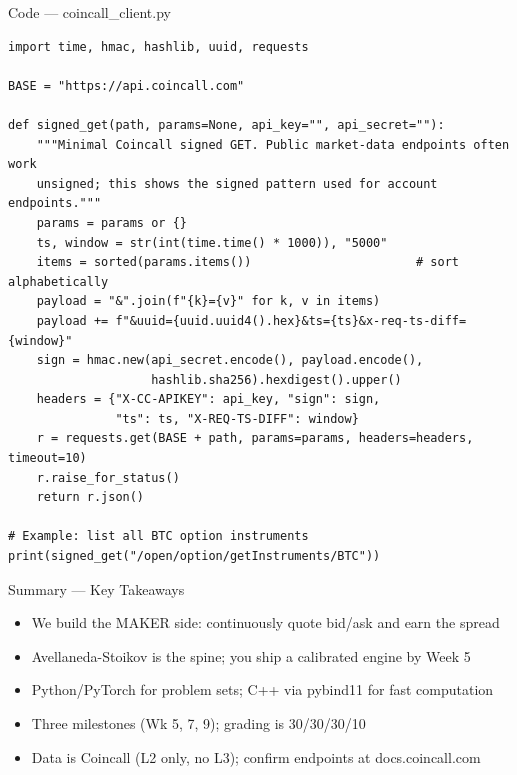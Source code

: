 \documentclass[aspectratio=169,10pt]{beamer}
\begin{document}
\begin{frame}[fragile]{Code --- coincall\_client.py}
\begin{lstlisting}
import time, hmac, hashlib, uuid, requests

BASE = "https://api.coincall.com"

def signed_get(path, params=None, api_key="", api_secret=""):
    """Minimal Coincall signed GET. Public market-data endpoints often work
    unsigned; this shows the signed pattern used for account endpoints."""
    params = params or {}
    ts, window = str(int(time.time() * 1000)), "5000"
    items = sorted(params.items())                       # sort alphabetically
    payload = "&".join(f"{k}={v}" for k, v in items)
    payload += f"&uuid={uuid.uuid4().hex}&ts={ts}&x-req-ts-diff={window}"
    sign = hmac.new(api_secret.encode(), payload.encode(),
                    hashlib.sha256).hexdigest().upper()
    headers = {"X-CC-APIKEY": api_key, "sign": sign,
               "ts": ts, "X-REQ-TS-DIFF": window}
    r = requests.get(BASE + path, params=params, headers=headers, timeout=10)
    r.raise_for_status()
    return r.json()

# Example: list all BTC option instruments
print(signed_get("/open/option/getInstruments/BTC"))
\end{lstlisting}
\end{frame}
\begin{frame}{Summary --- Key Takeaways}
\begin{itemize}
  \item We build the MAKER side: continuously quote bid/ask and earn the spread
  \item Avellaneda-Stoikov is the spine; you ship a calibrated engine by Week 5
  \item Python/PyTorch for problem sets; C++ via pybind11 for fast computation
  \item Three milestones (Wk 5, 7, 9); grading is 30/30/30/10
  \item Data is Coincall (L2 only, no L3); confirm endpoints at docs.coincall.com
\end{itemize}
\end{frame}
\end{document}

